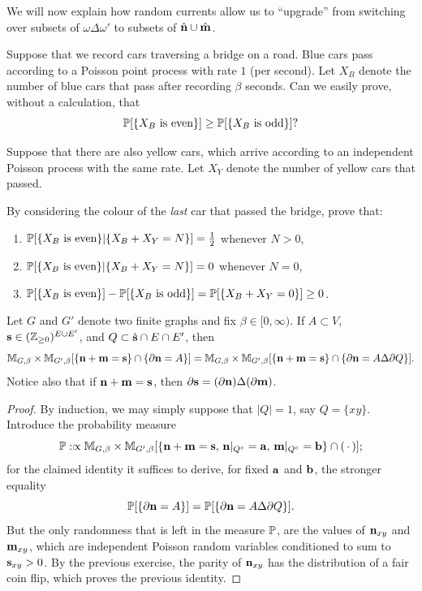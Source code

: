 We will now explain how random currents allow us to ``upgrade'' from switching
over subsets of $\omega\Delta\omega'$ to subsets of $\hat\n\cup\hat\m$.

\begin{exercise}
    Suppose that we record cars traversing a bridge on a road.
    Blue cars pass according to a Poisson point process with rate $1$ (per second).
    Let $X_B$ denote the number of blue cars that pass after recording $\beta$ seconds.
    Can we easily prove, without a calculation, that
    \[
        \P[\{\text{$X_B$ is even}\}]\geq \P[\{\text{$X_B$ is odd}\}]?
    \]

    Suppose that there are also yellow cars,
    which arrive according to an independent Poisson process with the same rate.
    Let $X_Y$ denote the number of yellow cars that passed.

    By considering the colour of the \emph{last} car that passed the bridge, prove that:
    \begin{enumerate}
        \item $\P[\{\text{$X_B$ is even}\}|\{X_B+X_Y= N \}]=\frac12$ whenever $N>0$,
        \item $\P[\{\text{$X_B$ is even}\}|\{X_B+X_Y= N \}]=0$ whenever $N=0$,
        \item $\P[\{\text{$X_B$ is even}\}]-\P[\{\text{$X_B$ is
            odd}\}]=\P[\{\text{$X_B+X_Y=0$}\}]\geq 0$.
    \end{enumerate}
\end{exercise}

\begin{lemma}
    \label{lem:explicit_switching_lemma}
    Let $G$ and $G'$ denote two finite graphs and fix $\beta\in[0,\infty)$.
    If $A\subset V$, $\s\in(\Z_{\geq 0})^{E\cup E'}$, and $Q\subset \hat\s\cap E\cap E'$,
    then
    \begin{equation}
        \M_{G,\beta}\times\M_{G',\beta}
        [\{\n+\m=\s\}\cap \{\partial\n=A\}]
        =
        \M_{G,\beta}\times\M_{G',\beta}
        [\{\n+\m=\s\}\cap \{\partial\n= A\Delta\partial Q\}].
    \end{equation}
    Notice also that if $\n+\m=\s$, then $\partial\s=(\partial\n)\Delta(\partial\m)$.
\end{lemma}

\begin{proof}
    By induction, we may simply suppose that $|Q|=1$, say $Q=\{xy\}$.
    Introduce the probability measure
    \[
        \P:\propto  \M_{G,\beta}\times\M_{G',\beta}
        [\{\n+\m=\s,\,\n|_{Q^c}=\a,\,\m|_{Q^c}=\b\}\cap(\blank)];
    \]
    for the claimed identity it suffices to derive, for fixed $\a$ and $\b$, the stronger equality
    \[
        \P[\{\partial\n=A\}]=\P[\{\partial\n=A\Delta\partial Q\}].
    \]
    But the only randomness that is left in the measure $\P$,
    are the values of $\n_{xy}$ and $\m_{xy}$,
    which are independent Poisson random variables conditioned to sum to $\s_{xy}>0$.
    By the previous exercise, the parity of $\n_{xy}$ has the distribution of a fair coin flip,
    which proves the previous identity.
\end{proof}


